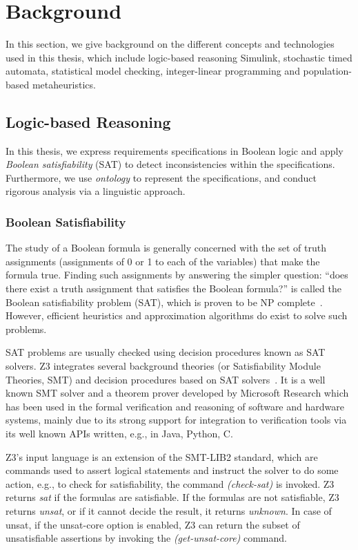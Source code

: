 \chapter{Background}
In this section, we give background on the different concepts and technologies used in this thesis, which include logic-based reasoning Simulink, stochastic timed automata,  statistical model checking, integer-linear programming and population-based metaheuristics.
\section{Logic-based Reasoning}
In this thesis, we express requirements specifications in  Boolean logic and apply \textit{Boolean satisfiability} (SAT) to detect inconsistencies within the specifications. Furthermore, we use \textit{ontology} to represent the specifications, and conduct rigorous analysis via a linguistic approach.
\subsection*{Boolean Satisfiability}
The study of a Boolean formula is generally concerned with the set of truth assignments (assignments of 0 or 1 to each of the variables) that make the formula true. Finding such assignments by answering the simpler question: ``does there exist a truth assignment that satisfies the Boolean formula?'' is called the Boolean satisfiability problem (SAT), which is proven to be NP complete~\cite{devlin2008satisfiability}\cite{Biere2009HandbookSatisfiability}. However, efficient heuristics and approximation algorithms do exist to solve such problems.

SAT problems are usually checked using decision procedures known as SAT solvers. Z3 integrates several background theories (or Satisfiability Module Theories, SMT) and decision procedures based on SAT solvers~\cite{DeMoura2008Z3:Solver}. It is a well known SMT solver and a theorem prover developed by Microsoft Research which has been used in the formal verification and reasoning of software and hardware systems, mainly due to its strong support for integration to verification tools via its well known APIs written, e.g., in Java, Python, C.

Z3's input language is an extension of the SMT-LIB2 standard, which are commands used to assert logical statements and instruct the solver to do some action, e.g., to check for satisfiability, the command \textit{(check-sat) }is invoked. Z3 returns \textit{sat} if the formulas are satisfiable. If the formulas are not satisfiable, Z3 returns \textit{unsat}, or if it cannot decide the result, it returns \textit{unknown}. In case of unsat, if the unsat-core option is enabled, Z3 can return the subset of unsatisfiable assertions by invoking the \textit{(get-unsat-core)} command.


